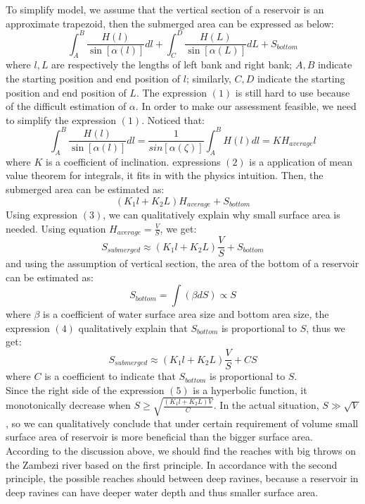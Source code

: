 \documentclass{mcmthesis}
\begin{document}
\indent To simplify model, we assume that the vertical section of a reservoir is an approximate trapezoid, then the submerged area can be expressed as below:
\begin{equation}\int_{A}^{B}\frac{H\left(l\right)}{\sin\left[\alpha\left(l\right)\right]}dl + \int_{C}^{D}\frac{H\left(L\right)}{\sin\left[\alpha\left(L\right)\right]}dL + S_{bottom}\end{equation}
where $l, L$ are respectively the lengths of left bank and right bank; $A, B$ indicate the starting position and end position of $l$; similarly, $C, D$ indicate the starting position and end position of $L$.
The expression $\left(1\right)$ is still hard to use because of the difficult estimation of $\alpha$. In order to make our assessment feasible, we need to simplify the expression $\left(1\right)$. Noticed that:
\begin{equation}
\int_{A}^{B}\frac{H\left(l\right)}{\sin\left[\alpha\left(l\right)\right]}dl = \frac{1}{sin\left[\alpha\left(\zeta\right)\right]}\int_{A}^{B}H\left(l\right)dl
= KH_{average}l
\end{equation}
where $K$ is a coefficient of inclination. expressions $\left(2\right)$ is a application of mean value theorem for integrals, it fits in with the physics intuition. Then, the submerged area can be estimated as:
\begin{equation}
\left(K_{1}l + K_{2}L\right)H_{average} + S_{bottom}
\end{equation}
Using expression $\left(3\right)$, we can qualitatively explain why small surface area is needed. Using equation $H_{average} = \frac{V}{S}$, we get:
\[S_{submerged} \approx \left(K_{1}l + K_{2}L\right)\frac{V}{S} + S_{bottom}\]
and using the assumption of vertical section, the area of the bottom of a reservoir can be estimated as:\\
\begin{equation}
S_{bottom} = \int\left(\beta dS \right) \propto S
\end{equation}  
where $\beta$ is a coefficient of water surface area size and bottom area size, the expression $\left(4\right)$ qualitatively explain that $S_{bottom}$ is proportional to $S$, thus we get:\\
\begin{equation}
S_{submerged} \approx \left(K_{1}l + K_{2}L\right)\frac{V}{S} + CS
\end{equation}
where $C$ is a coefficient to indicate that $S_{bottom}$ is proportional to $S$.\\
\indent Since the right side of the expression $\left(5\right)$ is a hyperbolic function, it monotonically decrease when $S \geq \sqrt{\frac{\left(K_{1}l + K_{2}L\right)V}{C}}$. In the actual situation, $S \gg \sqrt{V}$, so we can qualitatively conclude that under certain requirement of volume small surface area of reservoir is more beneficial than the bigger surface area.\\
\indent According to the discussion above, we should find the reaches with big throws on the Zambezi river based on the first principle. In accordance with the second principle, the possible reaches should between deep ravines, because a reservoir in deep ravines can have deeper water depth and thus smaller surface area.
\end{document}
